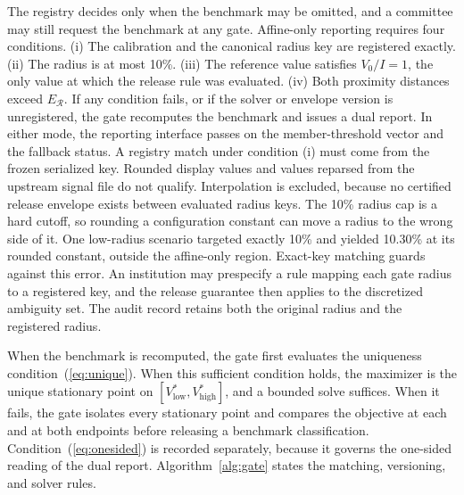 \documentclass[5p,times,authoryear]{elsarticle}
\theoremstyle{plain}
\newcommand{\Vlow}{V^{*}_{\mathrm{low}}}
\newcommand{\Vhigh}{V^{*}_{\mathrm{high}}}
\newcommand{\ER}{E_{\mathcal{R}}}
\begin{document}
The registry decides only when the benchmark may be omitted, and a committee may still request the benchmark at any gate. Affine-only reporting requires four conditions. (i) The calibration and the canonical radius key are registered exactly. (ii) The radius is at most 10\%. (iii) The reference value satisfies $V_0/I=1$, the only value at which the release rule was evaluated. (iv) Both proximity distances exceed $\ER$. If any condition fails, or if the solver or envelope version is unregistered, the gate recomputes the benchmark and issues a dual report. In either mode, the reporting interface passes on the member-threshold vector and the fallback status. A registry match under condition (i) must come from the frozen serialized key. Rounded display values and values reparsed from the upstream signal file do not qualify. Interpolation is excluded, because no certified release envelope exists between evaluated radius keys. The 10\% radius cap is a hard cutoff, so rounding a configuration constant can move a radius to the wrong side of it. One low-radius scenario targeted exactly 10\% and yielded 10.30\% at its rounded constant, outside the affine-only region. Exact-key matching guards against this error. An institution may prespecify a rule mapping each gate radius to a registered key, and the release guarantee then applies to the discretized ambiguity set. The audit record retains both the original radius and the registered radius.

When the benchmark is recomputed, the gate first evaluates the uniqueness condition~(\ref{eq:unique}). When this sufficient condition holds, the maximizer is the unique stationary point on $[\Vlow,\Vhigh]$, and a bounded solve suffices. When it fails, the gate isolates every stationary point and compares the objective at each and at both endpoints before releasing a benchmark classification. Condition~(\ref{eq:onesided}) is recorded separately, because it governs the one-sided reading of the dual report. Algorithm~\ref{alg:gate} states the matching, versioning, and solver rules.
\end{document}
